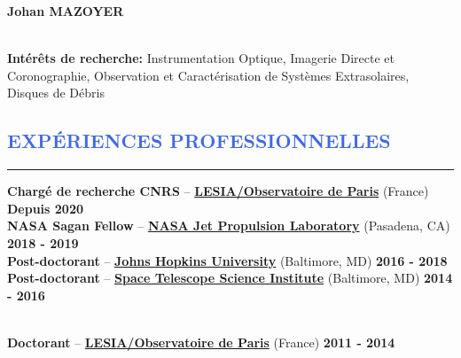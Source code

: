 \documentclass[11pt, a4paper, french]{article}
\begin{document}
\lfoot{\textcolor{Gray}{CV mis à jour en \yeardate\today}}

\begin{huge}
\noindent\textbf{Johan MAZOYER}
\end{huge}\\

\textbf{Intérêts de recherche:} Instrumentation Optique, Imagerie Directe et Coronographie,
Observation et Caractérisation de Systèmes Extrasolaires, Disques de Débris\\





\vspace{-0.8cm}
\textcolor{RoyalBlue}{\section{\large EXPÉRIENCES PROFESSIONNELLES}
\vspace{-0.2cm}\hrule}
\vspace{0.4cm}


\textbf{Chargé de recherche CNRS} --
\href{http://www.obspm.fr}{\textbf{LESIA/Observatoire de Paris}} (France)
\hfill     	 { \bf Depuis 2020}\\

\vspace{-0.05cm}
\textbf{NASA Sagan Fellow} --
\href{https://www.jpl.nasa.gov/}{\textbf{NASA Jet Propulsion Laboratory}} (Pasadena, CA)
\hfill      { \bf 2018 - 2019}\\

\vspace{-0.05cm}
\textbf{Post-doctorant} --
\href{http://physics-astronomy.jhu.edu/}{\textbf{Johns Hopkins University}} (Baltimore, MD)
\hfill   	 { \bf 2016 - 2018}\\

\vspace{-0.05cm}
\textbf{Post-doctorant} --
\href{http://www.stsci.edu}{\textbf{Space Telescope Science Institute}} (Baltimore, MD)
\hfill        { \bf 2014 - 2016}\\\

\vspace{-0.05cm}
\textbf{Doctorant} --
\href{http://www.obspm.fr/}{\textbf{LESIA/Observatoire de Paris}} (France)
\hfill        { \bf 2011 - 2014}\\
\end{document}
